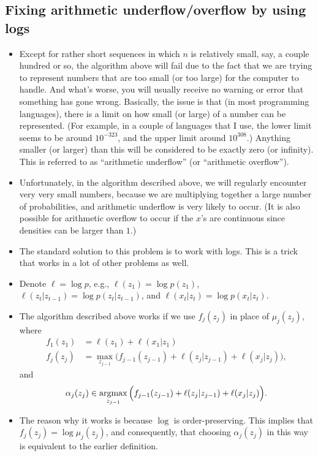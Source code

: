 \documentclass[12pt]{article}
\begin{document}
\subsection{Fixing arithmetic underflow/overflow by using logs}
\begin{itemize}
\item Except for rather short sequences in which $n$ is relatively small, say, a couple hundred or so, the algorithm above will fail due to the fact that we are trying to represent numbers that are too small (or too large) for the computer to handle. And what's worse, you will usually  receive no warning or error that something has gone wrong. Basically, the issue is that (in most programming languages), there is a limit on how small (or large) of a number can be represented. (For example, in a couple of languages that I use, the lower limit seems to be around $10^{-323}$, and the upper limit around $10^{308}$.) Anything smaller (or larger) than this will be considered to be exactly zero (or infinity). This is referred to as ``arithmetic underflow'' (or ``arithmetic overflow'').
\item Unfortunately, in the algorithm described above, we will regularly encounter very very small numbers, because we are multiplying together a large number of probabilities, and arithmetic underflow is very likely to occur.  (It is also possible for arithmetic overflow to occur if the $x$'s are continuous since densities can be larger than $1$.)
\item The standard solution to this problem is to work with logs. This is a trick that works in a lot of other problems as well.
\item Denote $\ell = \log p$, e.g., $\ell(z_1) = \log p(z_1)$, $\ell(z_t | z_{t -1}) = \log p(z_t | z_{t-1})$, and $\ell(x_t | z_t) = \log p(x_t | z_t)$.
\item The algorithm described above works if we use $f_j(z_j)$ in place of $\mu_j(z_j)$, where
\begin{align*}
f_1(z_1) &= \ell(z_1) + \ell(x_1 | z_1) \\
f_j(z_j) &= \max_{z_{j-1}} \Big(f_{j-1}(z_{j-1}) + \ell(z_j | z_{j-1}) + \ell(x_j | z_j) \Big),
\end{align*}
and 
$$ \alpha_j(z_j) \in \operatorname*{argmax}_{z_{j-1}} \Big(f_{j-1}(z_{j-1}) + \ell(z_j | z_{j-1}) + \ell(x_j | z_j) \Big).$$
\item The reason why it works is because $\log$ is order-preserving. This implies that $f_j(z_j) = \log \mu_j(z_j)$, and consequently, that choosing $\alpha_j(z_j)$ in this way is equivalent to the earlier definition.
\end{itemize}
\end{document}
